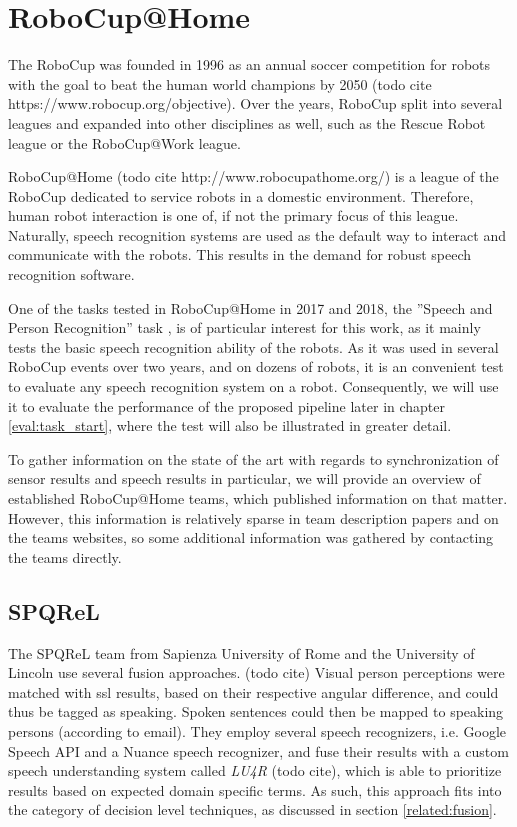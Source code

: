 
\section{RoboCup@Home}
\label{related:robocup}
The RoboCup was founded in 1996 as an annual soccer competition for robots with the goal to beat the human world champions by 2050 (todo cite https://www.robocup.org/objective).
Over the years, RoboCup split into several leagues and expanded into other disciplines as well, such as the Rescue Robot league or the RoboCup@Work league.

RoboCup@Home (todo cite http://www.robocupathome.org/) is a league of the RoboCup dedicated to service robots in a domestic environment. %
Therefore, human robot interaction is one of, if not the primary focus of this league.
Naturally, speech recognition systems are used as the default way to interact and communicate with the robots.
This results in the demand for robust speech recognition software.%

One of the tasks tested in RoboCup@Home in 2017 and 2018, the ''Speech and Person Recognition'' task \cite{rulebook_2018}, is of particular interest for this work, as it mainly tests the basic speech recognition ability of the robots. 
As it was used in several RoboCup events over two years, and on dozens of robots, it is an convenient test to evaluate any speech recognition system on a robot.
Consequently, we will use it to evaluate the performance of the proposed pipeline later in chapter \ref{eval:task_start}, where the test will also be illustrated in greater detail. 

To gather information on the state of the art with regards to synchronization of sensor results and speech results in particular, we will provide an overview of established RoboCup@Home teams, which published information on that matter.
However, this information is relatively sparse in team description papers and on the teams websites, so some additional information was gathered by contacting the teams directly.

\subsection{SPQReL}
The SPQReL team from Sapienza University of Rome and the University of Lincoln use several fusion approaches. (todo cite)
Visual person perceptions were matched with \gls{ssl} results, based on their respective angular difference, and could thus be tagged as speaking.
Spoken sentences could then be mapped to speaking persons (according to email).
They employ several speech recognizers, i.e. Google Speech API and a Nuance speech recognizer, and fuse their results with a custom speech understanding system called \textit{LU4R} (todo cite), which is able to prioritize results based on expected domain specific terms. 
As such, this approach fits into the category of decision level techniques, as discussed in section \ref{related:fusion}.


